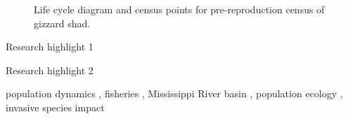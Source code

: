 \documentclass[preprint,review,12pt,authoryear]{elsarticle}
\begin{document}
\begin{frontmatter}
\begin{graphicalabstract}
\begin{figure}
\begin{center}
\end{center}
 \caption{\small{Life cycle diagram and census points for pre-reproduction census of gizzard shad.}}
\end{figure}

\end{graphicalabstract}

\begin{highlights}
\item Research highlight 1
\item Research highlight 2
\end{highlights}

\begin{keyword}
  population dynamics \sep
  fisheries \sep
  Mississippi River basin \sep
  population ecology \sep
  invasive species impact 



\end{keyword}

\end{frontmatter}


\end{document}
